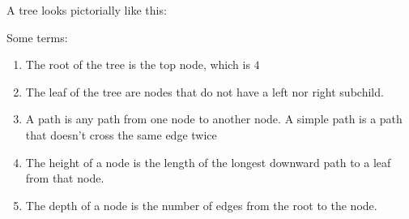   A tree looks pictorially like this: 
  \begin{center}
  \end{center}
  Some terms: 
  \begin{enumerate}
      \item The root of the tree is the top node, which is $4$
      \item The leaf of the tree are nodes that do not have a left nor right subchild. 
      \item A path is any path from one node to another node. A simple path is a path that doesn't cross the same edge twice 
      \item The height of a node is the length of the longest downward path to a leaf from that node. 
      \item The depth of a node is the number of edges from the root to the node. 
  \end{enumerate}


